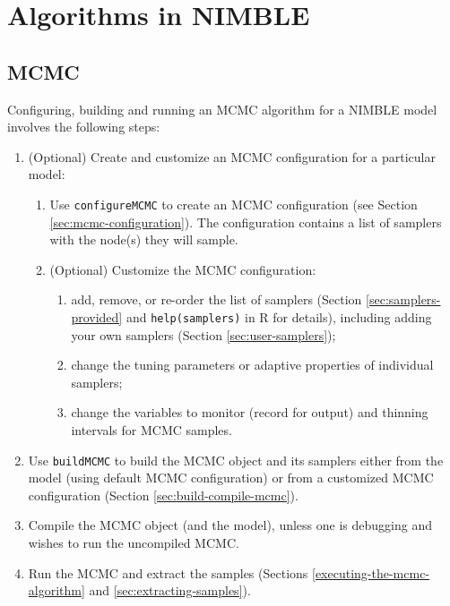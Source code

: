 \documentclass[12pt,oneside]{book}\usepackage[]{graphicx}\usepackage[]{color}
\def\cd#1{\texttt{#1}}
\begin{document}
\part{Algorithms in NIMBLE}
\label{part:algorithms}






\chapter{MCMC}



Configuring, building and running an MCMC algorithm for a NIMBLE model involves the following steps:

\begin{enumerate}
\item (Optional) Create and customize an MCMC configuration for a particular model:
  \begin{enumerate}
  \item Use \cd{configureMCMC} to create an MCMC configuration (see Section \ref{sec:mcmc-configuration}).  The configuration contains a list of samplers with the node(s) they will sample.
  \item (Optional) Customize the MCMC configuration: 
    \begin{enumerate}
    \item add, remove, or re-order the list of samplers (Section \ref{sec:samplers-provided} and \cd{help(samplers)} in R for details), including adding your own samplers (Section \ref{sec:user-samplers});
    \item change the tuning parameters or adaptive properties of individual samplers;
    \item change the variables to monitor (record for output) and thinning intervals for MCMC samples.
    \end{enumerate}
     
  \end{enumerate}
\item Use \cd{buildMCMC} to build the MCMC object and its samplers either from the model (using default MCMC configuration) or from a customized MCMC configuration (Section \ref{sec:build-compile-mcmc}).
\item Compile the MCMC object (and the model), unless one is debugging and wishes to run the uncompiled MCMC.
\item Run the MCMC and extract the samples (Sections \ref{executing-the-mcmc-algorithm} and \ref{sec:extracting-samples}).
\end{enumerate}
\end{document}
